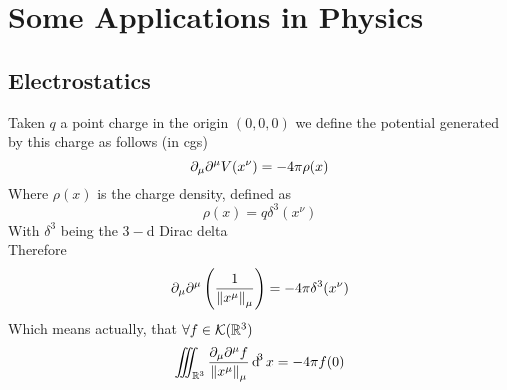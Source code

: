 \documentclass[../complete.tex]{subfiles}
\begin{document}
\section{Some Applications in Physics}
\subsection{Electrostatics}
\begin{eg}
	Taken $q$ a point charge in the origin $(0,0,0)$ we define the potential generated by this charge as follows (in cgs)
	\begin{equation*}
		\partial_\mu\partial^\mu V(x^\nu)=-4\pi\rho(x)
	\end{equation*}
	Where $\rho(x)$ is the charge density, defined as
	\begin{equation*}
		\rho(x)=q\delta^3(x^\nu)
	\end{equation*}
	With $\delta^3$ being the $3-$d Dirac delta\\
	Therefore
	\begin{equation*}
		\partial_\mu\partial^\mu\left( \frac{1}{\norm{x^\mu}_\mu} \right)=-4\pi\delta^3(x^\nu)
	\end{equation*}
	Which means actually, that $\forall f\in\mathcal{K}(\mathbb{R}^3)$
	\begin{equation*}
		\iiint_{\mathbb{R}^3}\frac{\partial_\mu\partial^\mu f}{\norm{x^\mu}_\mu}\operatorname{d\!}^3x=-4\pi f(0)
	\end{equation*}
\end{eg}
\end{document}
